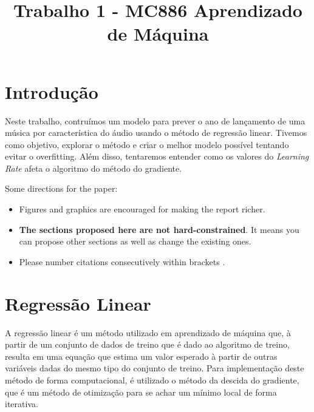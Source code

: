 \documentclass[conference]{IEEEtran}
\begin{document}
\title{Trabalho 1 - MC886 Aprendizado de Máquina}

\author{
\and
{}
}

\maketitle

\section{Introdução}

Neste trabalho, contruímos um modelo para prever o ano de lançamento de uma música por característica do áudio usando o método de regressão linear.
Tivemos como objetivo, explorar o método e criar o melhor modelo possível tentando evitar o overfitting.
Além disso, tentaremos entender como os valores do \textit{Learning Rate} afeta o algoritmo do método do gradiente.

Some directions for the paper:

\begin{itemize}
	\item Figures and graphics are encouraged for making the
	report richer.
	\item {\bf The sections proposed here are not hard-constrained}. It means you can propose other sections as well as change the existing ones.
	\item Please number citations consecutively within brackets \cite{b1}. 
\end{itemize}

\section{Regressão Linear}
 
A regressão linear é um método utilizado em aprendizado de máquina que, à partir de um conjunto de dados de treino que é dado ao algoritmo de treino, resulta em uma equação que estima um valor esperado à partir de outras variáveis dadas do mesmo tipo do conjunto de treino.
Para implementação deste método de forma computacional, é utilizado o método da descida do gradiente, que é um método de otimização para se achar um mínimo local de forma iterativa.
\end{document}
